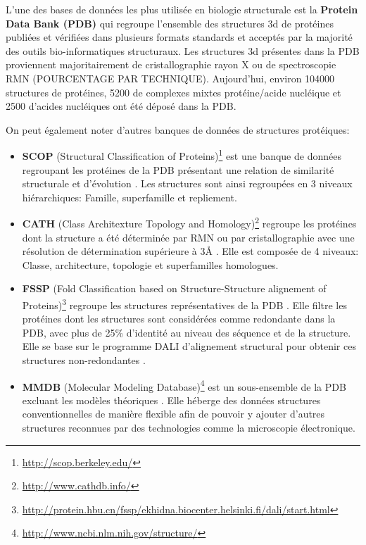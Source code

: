 L'une des bases de données les plus utilisée en biologie structurale est la \textbf{Protein Data Bank (PDB)} \cite{berman_protein_2000} qui regroupe l'ensemble des structures 3d de protéines publiées et vérifiées dans plusieurs formats standards et acceptés par la majorité des outils bio-informatiques structuraux. Les structures 3d présentes dans la PDB proviennent majoritairement de cristallographie rayon X ou de spectroscopie RMN (POURCENTAGE PAR TECHNIQUE). Aujourd'hui, environ 104000 structures de protéines, 5200 de complexes mixtes protéine/acide nucléique et 2500 d'acides nucléiques ont été déposé dans la PDB.

On peut également noter d'autres banques de données de structures protéiques:
\begin{itemize}
	\item \textbf{SCOP} (Structural Classification of Proteins)\footnote{\url{http://scop.berkeley.edu/}} est une banque de données regroupant les protéines de la PDB présentant une relation de similarité structurale et d'évolution \cite{murzin1995scop}. Les structures sont ainsi regroupées en 3 niveaux hiérarchiques: Famille, superfamille et repliement.
	\item \textbf{CATH} (Class Architexture Topology and Homology)\footnote{\url{http://www.cathdb.info/}} regroupe les protéines dont la structure a été déterminée par RMN ou par cristallographie avec une résolution de détermination supérieure à 3\r{A} \cite{sillitoe2015cath}. Elle est composée de 4 niveaux: Classe, architecture, topologie et superfamilles homologues.
	\item \textbf{FSSP} (Fold Classification based on Structure-Structure alignement of Proteins)\footnote{\url{http://protein.hbu.cn/fssp/ekhidna.biocenter.helsinki.fi/dali/start.html}} regroupe les structures représentatives de la PDB \cite{holm1996mapping}. Elle filtre les protéines dont les structures sont considérées comme redondante dans la PDB, avec plus de 25\% d'identité au niveau des séquence et de la structure. Elle se base sur le programme DALI d'alignement structural pour obtenir ces structures non-redondantes \cite{holm1998touring}.
	\item \textbf{MMDB} (Molecular Modeling Database)\footnote{\url{http://www.ncbi.nlm.nih.gov/structure/}} est un sous-ensemble de la PDB excluant les modèles théoriques \cite{madej2014mmdb}. Elle héberge des données structures conventionnelles de manière flexible afin de pouvoir y ajouter d'autres structures reconnues par des technologies comme la microscopie électronique.
\end{itemize}

